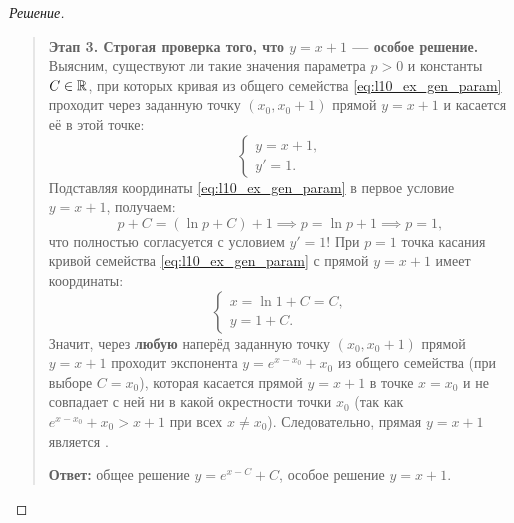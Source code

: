 \begin{example}
\begin{proof}[Решение]
\begin{quote}
            \textbf{Этап 3. Строгая проверка того, что $y = x + 1$ — особое
            решение.}\\
            Выясним, существуют ли такие значения параметра $p > 0$ и константы
            $C \in \mathbb{R}$, при которых кривая из общего семейства
            \eqref{eq:l10_ex_gen_param} проходит через заданную точку
            $(x_0, x_0 + 1)$ прямой $y = x + 1$ и касается её в этой точке:
            \begin{equation} \label{eq:l10_ex_tangency}
                \begin{cases}
                    y = x + 1, \\
                    y' = 1.
                \end{cases} \tag{11}
            \end{equation}
            Подставляя координаты \eqref{eq:l10_ex_gen_param} в первое
            условие $y = x + 1$, получаем:
            \[
                p + C = (\ln p + C) + 1 \implies p = \ln p + 1 \implies p = 1,
            \]
            что полностью согласуется с условием $y' = 1$! При $p = 1$ точка
            касания кривой семейства \eqref{eq:l10_ex_gen_param} с прямой
            $y = x + 1$ имеет координаты:
            \[
                \begin{cases}
                    x = \ln 1 + C = C, \\
                    y = 1 + C.
                \end{cases}
            \]
            Значит, через \textbf{любую} наперёд заданную точку $(x_0, x_0 + 1)$
            прямой $y = x + 1$ проходит экспонента $y = e^{x - x_0} + x_0$ из
            общего семейства (при выборе $C = x_0$), которая касается прямой
            $y = x + 1$ в точке $x = x_0$ и не совпадает с ней ни в какой
            окрестности точки $x_0$ (так как $e^{x - x_0} + x_0 > x + 1$ при
            всех $x \neq x_0$). Следовательно, прямая $y = x + 1$ является
            .

            \textbf{Ответ:} общее решение $y = e^{x - C} + C$, особое решение
            $y = x + 1$.
        \end{quote}
    \end{proof}
\end{example}

